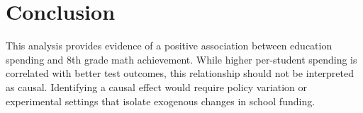 \documentclass[12pt]{article}
\begin{document}
\section*{Conclusion}
This analysis provides evidence of a positive association between education spending and 8th grade math achievement. 
While higher per-student spending is correlated with better test outcomes, this relationship should not be interpreted as causal. 
Identifying a causal effect would require policy variation or experimental settings that isolate exogenous changes in school funding.
\end{document}
